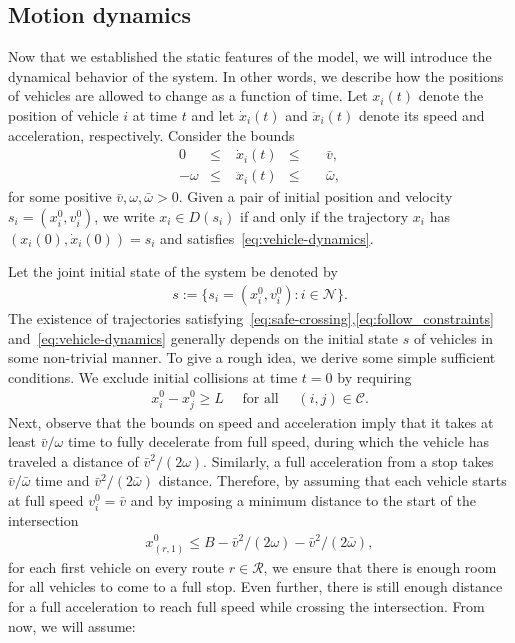 \documentclass{report}
\theoremstyle{definition}
\theoremstyle{plain}
\begin{document}
\subsection{Motion dynamics}\label{sec:dynamics}

Now that we established the static features of the model, we will introduce the
dynamical behavior of the system. In other words, we describe how the positions
of vehicles are allowed to change as a function of time.
%
Let $x_{i}(t)$ denote the position of vehicle $i$ at time $t$ and let
$\dot{x}_{i}(t)$ and $\ddot{x}_{i}(t)$ denote its speed and acceleration,
respectively.
%
Consider the bounds
\begin{subequations}\label{eq:vehicle-dynamics}
\begin{alignat}{3}
  0         & \leq & \; \dot{x}_{i}(t)  & \leq && \; \bar{v}  , \label{eq:speed-constr} \\
  {-\omega} & \leq & \; \ddot{x}_{i}(t) & \leq && \; \bar{\omega} ,
\end{alignat}
\end{subequations}
for some positive $\bar{v}, \omega, \bar{\omega} > 0$.
%
Given a pair of initial position and velocity $s_{i} = (x_{i}^{0}, v_{i}^{0})$,
we write $x_{i} \in D(s_{i})$ if and only if the trajectory $x_{i}$ has
$(x_{i}(0), \dot{x}_{i}(0)) = s_{i}$ and satisfies~\eqref{eq:vehicle-dynamics}.

Let the joint initial state of the system be denoted by
\begin{align*}
  s := \{s_{i} = (x_{i}^{0}, v_{i}^{0}) : i \in \mathcal{N} \} .
\end{align*}
%
The existence of trajectories
satisfying~\eqref{eq:safe-crossing},\eqref{eq:follow_constraints}
and~\eqref{eq:vehicle-dynamics} generally depends on the initial state $s$ of
vehicles in some non-trivial manner.
%
To give a rough idea, we derive some simple sufficient conditions.
We exclude initial collisions at time $t=0$ by requiring
\begin{align}\label{eq:initially-safe-assumption}
 x_{i}^{0} - x_{j}^{0} \geq L \quad \text{ for all } \quad  (i,j) \in \mathcal{C} .
\end{align}
%
%
Next, observe that the bounds on speed and acceleration imply that it takes at
least $\bar{v}/\omega$ time to fully decelerate from full speed, during which the
vehicle has traveled a distance of $\bar{v}^2/(2\omega)$. Similarly, a full
acceleration from a stop takes $\bar{v}/\bar{\omega}$ time and
$\bar{v}^2/(2\bar{\omega})$ distance.
%
Therefore, by assuming that each vehicle starts at full speed
$v_{i}^{0} = \bar{v}$ and by imposing a minimum distance to the start of the
intersection
\begin{align}\label{eq:initial-safe-stopping-assumption}
  x_{(r,1)}^{0} \leq B - \bar{v}^2/(2\omega) - \bar{v}^2/(2\bar{\omega}),
\end{align}
for each first vehicle on every route
$r \in \mathcal{R}$, we ensure that there is enough room for all vehicles to
come to a full stop. Even further, there is still enough distance for a full
acceleration to reach full speed while crossing the intersection.
%
From now, we will assume:
\end{document}
